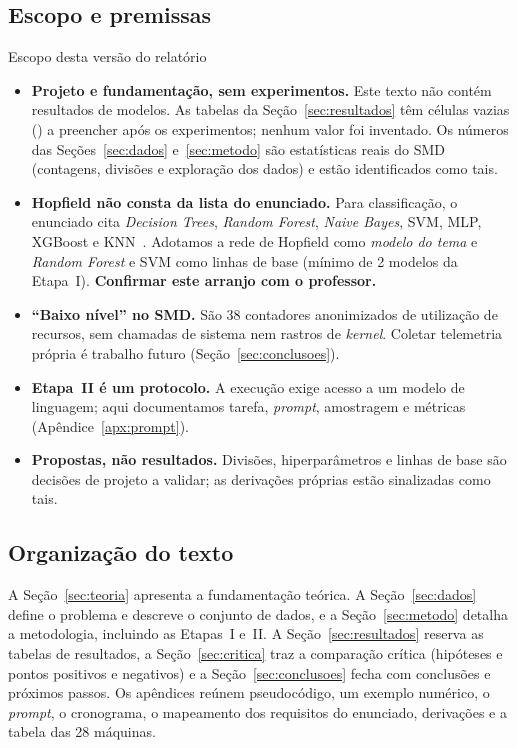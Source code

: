 \subsection{Escopo e premissas}
\begin{notabox}{Escopo desta versão do relatório}
\begin{itemize}
  \item \textbf{Projeto e fundamentação, sem experimentos.} Este texto não contém resultados de modelos.
        As tabelas da Seção~\ref{sec:resultados} têm células vazias (\lacuna) a preencher após os
        experimentos; nenhum valor foi inventado. Os números das Seções~\ref{sec:dados} e~\ref{sec:metodo}
        são estatísticas reais do SMD (contagens, divisões e exploração dos dados) e estão identificados
        como tais.
  \item \textbf{Hopfield não consta da lista do enunciado.} Para classificação, o enunciado cita \emph{Decision
        Trees}, \emph{Random Forest}, \emph{Naive Bayes}, SVM, MLP, XGBoost e KNN~\cite{enunciado}. Adotamos
        a rede de Hopfield como \emph{modelo do tema} e \emph{Random Forest} e SVM como linhas de base
        (mínimo de 2 modelos da Etapa~I). \textbf{Confirmar este arranjo com o professor.}
  \item \textbf{``Baixo nível'' no SMD.} São 38 contadores anonimizados de utilização de recursos, sem
        chamadas de sistema nem rastros de \emph{kernel}. Coletar telemetria própria é trabalho futuro
        (Seção~\ref{sec:conclusoes}).
  \item \textbf{Etapa~II é um protocolo.} A execução exige acesso a um modelo de linguagem; aqui
        documentamos tarefa, \emph{prompt}, amostragem e métricas (Apêndice~\ref{apx:prompt}).
  \item \textbf{Propostas, não resultados.} Divisões, hiperparâmetros e linhas de base são decisões de
        projeto a validar; as derivações próprias estão sinalizadas como tais.
\end{itemize}
\end{notabox}

\subsection{Organização do texto}
A Seção~\ref{sec:teoria} apresenta a fundamentação teórica. A Seção~\ref{sec:dados} define o problema e
descreve o conjunto de dados, e a Seção~\ref{sec:metodo} detalha a metodologia, incluindo as Etapas~I e~II.
A Seção~\ref{sec:resultados} reserva as tabelas de resultados, a Seção~\ref{sec:critica} traz a comparação
crítica (hipóteses e pontos positivos e negativos) e a Seção~\ref{sec:conclusoes} fecha com conclusões e
próximos passos. Os apêndices reúnem pseudocódigo, um exemplo numérico, o \emph{prompt}, o cronograma, o
mapeamento dos requisitos do enunciado, derivações e a tabela das 28 máquinas.
